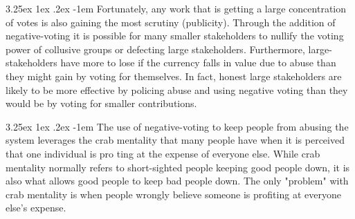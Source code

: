 \documentclass{article}
\makeatletter
\renewcommand\paragraph{\@startsection{paragraph}{5}{\z@}%
  {3.25ex \@plus1ex \@minus.2ex}%
  {-1em}%
  {\normalfont\normalsize\bfseries}}
\makeatother
\begin{document}
					\paragraph{}
						Fortunately, any work that is getting a large concentration of votes is also gaining the most scrutiny (publicity). Through the addition of negative-voting it is possible for many smaller stakeholders to nullify the voting power of collusive groups or defecting large stakeholders. Furthermore, large-stakeholders have more to lose if the currency falls in value due to abuse than they might gain by voting for themselves. In fact, honest large stakeholders are likely to be more effective by policing abuse and using negative voting than they would be by voting for smaller contributions.

					\paragraph{}
						The use of negative-voting to keep people from abusing the system leverages the crab mentality that many people have when it is perceived that one individual is pro ting at the expense of everyone else. While crab mentality normally refers to short-sighted people keeping good people down, it is also what allows good people to keep bad people down. The only "problem" with crab mentality is when people wrongly believe someone is profiting at everyone else's expense.
\end{document}
